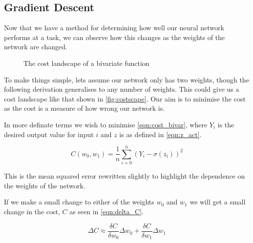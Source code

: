 \subsection{Gradient Descent}
Now that we have a method for determining how well our neural network performs at a task, we can observe how this changes as the weights of the network are changed.


\begin{figure}
\begin{center}
\caption{The cost landscape of a bivariate function}
\label{fig:costscape}
\end{center}
\end{figure}

To make things simple, lets assume our network only has two weights, though the following derivation generalises to any number of weights. This could give us a cost landscape like that shown in \autoref{fig:costscape}. Our aim is to minimise the cost as the cost is a measure of how wrong our network is.

In more definate terms we wish to minimise \autoref{eqn:cost_bivar}, where $Y_i$ is the desired output value for input $i$ and $z$ is as defined in \autoref{eqn:z_act}.

\begin{equation}
C(w_0, w_1) = \frac{1}{n}\sum_{i=0}^{n} (Y_i - \sigma(z_i))^2
\label{eqn:cost_bivar}
\end{equation}

This is the mean squared error rewritten slightly to highlight the dependence on the weights of the network.

If we make a small change to either of the weights $w_0$ and $w_1$ we will get a small change in the cost, $C$ as seen in \autoref{eqn:delta_C}.

\begin{equation}
\Delta C \approx \frac{\delta C}{\delta w_0} \Delta w_0 + \frac{\delta C}{\delta w_1} \Delta w_1
\label{eqn:delta_C}
\end{equation}

